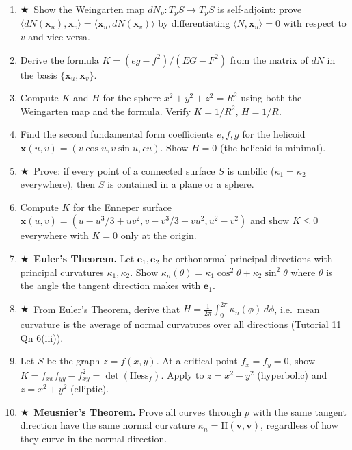 \documentclass[11pt, a4paper]{article}
\newcommand{\kp}{\kappa}
\newcommand{\hard}{$\bigstar$\ }
\begin{document}
\begin{enumerate}[label=\textbf{Q\arabic*.}, leftmargin=*, itemsep=6pt]

\item \hard Show the Weingarten map $dN_p:T_pS\to T_pS$ is self-adjoint: prove $\langle dN(\mathbf{x}_u),\mathbf{x}_v\rangle=\langle\mathbf{x}_u,dN(\mathbf{x}_v)\rangle$ by differentiating $\langle N,\mathbf{x}_u\rangle=0$ with respect to $v$ and vice versa.

\item Derive the formula $K=(eg-f^2)/(EG-F^2)$ from the matrix of $dN$ in the basis $\{\mathbf{x}_u,\mathbf{x}_v\}$.

\item Compute $K$ and $H$ for the sphere $x^2+y^2+z^2=R^2$ using both the Weingarten map and the formula. Verify $K=1/R^2$, $H=1/R$.

\item Find the second fundamental form coefficients $e,f,g$ for the helicoid $\mathbf{x}(u,v)=(v\cos u,v\sin u,cu)$. Show $H=0$ (the helicoid is minimal).

\item \hard Prove: if every point of a connected surface $S$ is umbilic ($\kp_1=\kp_2$ everywhere), then $S$ is contained in a plane or a sphere.

\item Compute $K$ for the Enneper surface $\mathbf{x}(u,v)=(u-u^3/3+uv^2, v-v^3/3+vu^2, u^2-v^2)$ and show $K\leq 0$ everywhere with $K=0$ only at the origin.

\item \hard \textbf{Euler's Theorem.} Let $\mathbf{e}_1,\mathbf{e}_2$ be orthonormal principal directions with principal curvatures $\kp_1,\kp_2$. Show $\kp_n(\theta)=\kp_1\cos^2\theta+\kp_2\sin^2\theta$ where $\theta$ is the angle the tangent direction makes with $\mathbf{e}_1$.

\item \hard From Euler's Theorem, derive that $H=\frac{1}{2\pi}\int_0^{2\pi}\kp_n(\phi)\,d\phi$, i.e.\ mean curvature is the average of normal curvatures over all directions (Tutorial 11 Qn 6(iii)).

\item Let $S$ be the graph $z=f(x,y)$. At a critical point $f_x=f_y=0$, show $K=f_{xx}f_{yy}-f_{xy}^2=\det(\text{Hess}_f)$. Apply to $z=x^2-y^2$ (hyperbolic) and $z=x^2+y^2$ (elliptic).

\item \hard \textbf{Meusnier's Theorem.} Prove all curves through $p$ with the same tangent direction have the same normal curvature $\kp_n=\mathrm{II}(\mathbf{v},\mathbf{v})$, regardless of how they curve in the normal direction.


\end{enumerate}
\end{document}
